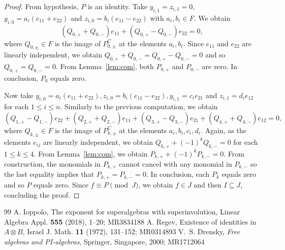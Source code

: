 \documentclass[10pt,a4paper]{amsart}
\begin{document}
\begin{proof}
		From hypothesis, $P$ is an identity. Take $y_{i, 1}= z_{i, 1}=0$, $y_{i, 0}=a_i(e_{11}+e_{22})$ and $z_{i, 0}=b_i (e_{11}-e_{22})$ with $a_i, b_i\in F$. We obtain
		$$(Q_{0, +}+Q_{0, -})e_{1 1}+(Q_{0, +}-Q_{0, -})e_{2 2}=0,$$
		where $Q_{0, \pm}\in F$ is the image of $P_{0, \pm}^C$ at the elements $a_i, b_i$. Since $e_{11}$ and $e_{22}$ are linearly independent, we obtain $Q_{0, +}+Q_{0, -}=Q_{0, +}-Q_{0, -}=0$ and so $Q_{0, +}=Q_{0, -}=0$. From Lemma~\ref{lem:com}, both $P_{0, +}$ and $P_{0, -}$ are zero. In conclusion, $P_0$ equals zero.
		
		Now take $y_{i, 0}=a_i(e_{11}+e_{22}), z_{i, 0}=b_i(e_{11}-e_{22}), y_{i, 1}=c_i e_{21}$ and $z_{i, 1}=d_i e_{12}$ for each $1\le i\le n$.
		Similarly to the previous computation, we obtain 
		$$(Q_{1, +}-Q_{1, -})e_{22}+(Q_{2, +}+Q_{2, -})e_{11}+(Q_{3, +}-Q_{3, -})e_{21}+(Q_{4, +}+Q_{4, -}) e_{12}=0,$$
		where $Q_{k, \pm}\in F$ is the image of $P_{k, \pm}^C$ at the elements $a_i, b_i, c_i, d_i$. 
		Again, as the elements $e_{ij}$ are linearly independent, we obtain $Q_{k, +}+(-1)^kQ_{k, -}=0$ for each $1\le k\le 4$. From Lemma~\ref{lem:com}, we obtain $P_{k, +}+(-1)^kP_{k, -}=0$. From construction, the monomials in $P_{k, +}$ cannot cancel with any monomial in  $P_{k, -}$ so the last equality implies that $P_{k, +}=P_{k, -}=0$. In conclusion, each $P_k$ equals zero and so $P$ equals zero. Since $f\equiv P\pmod J$, we obtain $f\in J$ and then $I\subseteq J$, concluding the proof.
	\end{proof}

\begin{thebibliography}{99}
 A. Ioppolo, The exponent for superalgebras with superinvolution, Linear Algebra Appl. {\bf 555} (2018), 1--20; MR3834188
 A. Regev, Existence of identities in $A\otimes B$, Israel J. Math. {\bf 11} (1972), 131--152; MR0314893
 V.~S. Drensky, {\it Free algebras and PI-algebras}, Springer, Singapore, 2000; MR1712064
\end{thebibliography}
\end{document}
